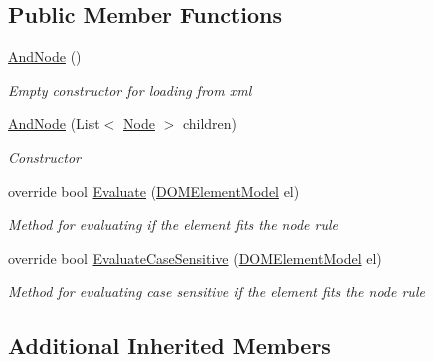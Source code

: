 \subsection*{Public Member Functions}
\begin{DoxyCompactItemize}
\item 
\hyperlink{class_web_analyzer_1_1_models_1_1_settings_model_1_1_expression_tree_1_1_and_node_a615d3ee51170839291bd40488a3c98f6}{And\+Node} ()
\begin{DoxyCompactList}\small\item\em Empty constructor for loading from xml \end{DoxyCompactList}\item 
\hyperlink{class_web_analyzer_1_1_models_1_1_settings_model_1_1_expression_tree_1_1_and_node_a377d2c58472a37379647d57188b566d8}{And\+Node} (List$<$ \hyperlink{class_web_analyzer_1_1_models_1_1_settings_model_1_1_expression_tree_1_1_node}{Node} $>$ children)
\begin{DoxyCompactList}\small\item\em Constructor \end{DoxyCompactList}\item 
override bool \hyperlink{class_web_analyzer_1_1_models_1_1_settings_model_1_1_expression_tree_1_1_and_node_aaa094a884ae4408ec6d6379d3619e7b1}{Evaluate} (\hyperlink{class_web_analyzer_1_1_models_1_1_data_model_1_1_d_o_m_element_model}{D\+O\+M\+Element\+Model} el)
\begin{DoxyCompactList}\small\item\em Method for evaluating if the element fits the node rule \end{DoxyCompactList}\item 
override bool \hyperlink{class_web_analyzer_1_1_models_1_1_settings_model_1_1_expression_tree_1_1_and_node_a03a2a4ac1c8f85f385682e3e5456fb05}{Evaluate\+Case\+Sensitive} (\hyperlink{class_web_analyzer_1_1_models_1_1_data_model_1_1_d_o_m_element_model}{D\+O\+M\+Element\+Model} el)
\begin{DoxyCompactList}\small\item\em Method for evaluating case sensitive if the element fits the node rule \end{DoxyCompactList}\end{DoxyCompactItemize}
\subsection*{Additional Inherited Members}



